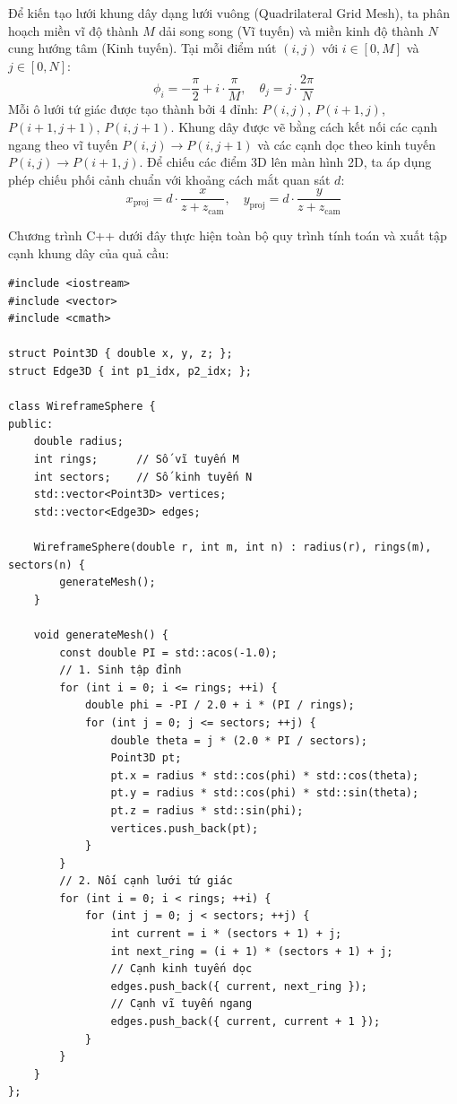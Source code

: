 Để kiến tạo lưới khung dây dạng lưới vuông (Quadrilateral Grid Mesh), ta phân hoạch miền vĩ độ thành $M$ dải song song (Vĩ tuyến) và miền kinh độ thành $N$ cung hướng tâm (Kinh tuyến). Tại mỗi điểm nút $(i, j)$ với $i \in [0, M]$ và $j \in [0, N]$:
\begin{equation}
\phi_i = -\frac{\pi}{2} + i \cdot \frac{\pi}{M}, \quad \theta_j = j \cdot \frac{2\pi}{N}
\end{equation}
Mỗi ô lưới tứ giác được tạo thành bởi 4 đỉnh: $P(i, j)$, $P(i+1, j)$, $P(i+1, j+1)$, $P(i, j+1)$. Khung dây được vẽ bằng cách kết nối các cạnh ngang theo vĩ tuyến $P(i, j) \to P(i, j+1)$ và các cạnh dọc theo kinh tuyến $P(i, j) \to P(i+1, j)$. Để chiếu các điểm 3D lên màn hình 2D, ta áp dụng phép chiếu phối cảnh chuẩn với khoảng cách mắt quan sát $d$:
\begin{equation}
x_{\text{proj}} = d \cdot \frac{x}{z + z_{\text{cam}}}, \quad y_{\text{proj}} = d \cdot \frac{y}{z + z_{\text{cam}}}
\end{equation}

Chương trình C++ dưới đây thực hiện toàn bộ quy trình tính toán và xuất tập cạnh khung dây của quả cầu:

\begin{verbatim}
#include <iostream>
#include <vector>
#include <cmath>

struct Point3D { double x, y, z; };
struct Edge3D { int p1_idx, p2_idx; };

class WireframeSphere {
public:
    double radius;
    int rings;      // Số vĩ tuyến M
    int sectors;    // Số kinh tuyến N
    std::vector<Point3D> vertices;
    std::vector<Edge3D> edges;

    WireframeSphere(double r, int m, int n) : radius(r), rings(m), sectors(n) {
        generateMesh();
    }

    void generateMesh() {
        const double PI = std::acos(-1.0);
        // 1. Sinh tập đỉnh
        for (int i = 0; i <= rings; ++i) {
            double phi = -PI / 2.0 + i * (PI / rings);
            for (int j = 0; j <= sectors; ++j) {
                double theta = j * (2.0 * PI / sectors);
                Point3D pt;
                pt.x = radius * std::cos(phi) * std::cos(theta);
                pt.y = radius * std::cos(phi) * std::sin(theta);
                pt.z = radius * std::sin(phi);
                vertices.push_back(pt);
            }
        }
        // 2. Nối cạnh lưới tứ giác
        for (int i = 0; i < rings; ++i) {
            for (int j = 0; j < sectors; ++j) {
                int current = i * (sectors + 1) + j;
                int next_ring = (i + 1) * (sectors + 1) + j;
                // Cạnh kinh tuyến dọc
                edges.push_back({ current, next_ring });
                // Cạnh vĩ tuyến ngang
                edges.push_back({ current, current + 1 });
            }
        }
    }
};
\end{verbatim}

